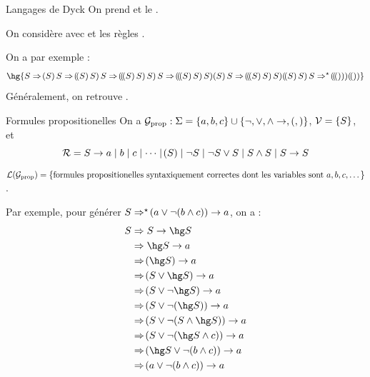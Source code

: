     \begin{example}{Langages de Dyck}{}
        On prend \hg{$\Sigma = \ens{(,) ,\{,\} ,[,] ,<,>}$} et le .\medskip
        
        On considère  avec  et les règles .
        
        On a par exemple :
        \[ \hg{S \Rightarrow \p{S} S \Rightarrow \p{\p{S} S} S \Rightarrow \p{\p{\p{S} S} S} S \Rightarrow \p{\p{\p{S} S} S} \p{S} S \Rightarrow \p{\p{\p{S} S} S} \p{\p{S} S} S \Rightarrow^\star \p{\p{\p{}}} \p{\p{}}}\]
        Généralement, on retrouve .
    \end{example}
    
    \begin{example}{Formules propositionelles}{}
        On a $\mathcal{G}_\text{prop} : \Sigma = \left\{a, b, c\right\} \cup \left\{\neg, \lor, \land \rightarrow, (, )\right\}$, $\mathcal{V} = \left\{S\right\}$, et 
        \[ \mathcal{R} = S \rightarrow a \mid b \mid c \mid \dots \mid \!\left(S\right) \mid \neg S \mid \neg S \lor S \mid S \land S \mid S \rightarrow S\]
        $\mathcal{L}\!\left(\mathcal{G}_\text{prop}\right) = \left\{\text{formules propositionelles syntaxiquement correctes dont les variables sont} \ a, b, c, \dots\right\}$.\medskip
        
        Par exemple, pour générer $S \Rightarrow^\star \!\left(a \lor \neg \!\left(b \land c\right)\right) \rightarrow a$, on a :
        \begin{align*}
            S &\Rightarrow S \rightarrow \hg S\\
            &\Rightarrow \hg S \rightarrow a\\
            &\Rightarrow \p{\hg S} \rightarrow a\\
            &\Rightarrow \p{S \lor \hg S} \rightarrow a\\
            &\Rightarrow \p{S \lor \neg \hg S} \rightarrow a\\
            &\Rightarrow \p{S \lor \neg \p{\hg S}} \rightarrow a\\
            &\Rightarrow \p{S \lor \neg \p{S \land \hg S}} \rightarrow a\\
            &\Rightarrow \p{S \lor \neg \p{\hg S \land c}} \rightarrow a\\
            &\Rightarrow \p{\hg S \lor \neg \p{b \land c}} \rightarrow a\\
            &\Rightarrow \p{a \lor \neg \p{b \land c}} \rightarrow a
        \end{align*}
    \end{example}
    
